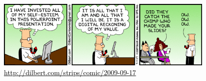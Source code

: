 \begin{tussenpagina}{}
    

    \begin{figure}
        \includegraphics[width=0.95\textwidth]{images/dilbert.png}
        \vspace{-0.2cm}
        \caption{\href{http://dilbert.com/strips/comic/2009-09-17/}{\textcolor{black}{http://dilbert.com/strips/comic/2009-09-17}}}
    \end{figure}
\end{tussenpagina}


